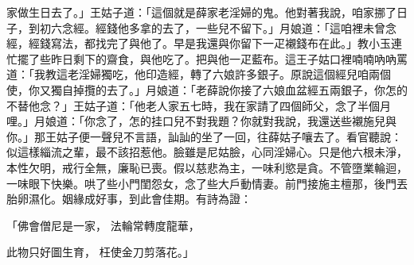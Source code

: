 家做生日去了。」王姑子道：「這個就是薛家老淫婦的鬼。他對著我說，咱家挪了日子，到初六念經。經錢他多拿的去了，一些兒不留下。」月娘道：「這咱裡未曾念經，經錢寫法，都找完了與他了。早是我還與你留下一疋襯錢布在此。」教小玉連忙擺了些昨日剩下的齋食，與他吃了。把與他一疋藍布。這王子姑口裡喃喃吶吶罵道：「我教這老淫婦獨吃，他印造經，轉了六娘許多銀子。原說這個經兒咱兩個使，你又獨自掉攬的去了。」月娘道：「老薛說你接了六娘血盆經五兩銀子，你怎的不替他念？」王姑子道：「他老人家五七時，我在家請了四個師父，念了半個月哩。」月娘道：「你念了，怎的挂口兒不對我題？你就對我說，我還送些襯施兒與你。」那王姑子便一聲兒不言語，訕訕的坐了一回，往薛姑子嚷去了。看官聽說：似這樣緇流之輩，最不該招惹他。臉雖是尼姑臉，心同淫婦心。只是他六根未淨，本性欠明，戒行全無，廉恥已喪。假以慈悲為主，一味利慾是貪。不管墮業輪迴，一味眼下快樂。哄了些小門閨怨女，念了些大戶動情妻。前門接施主檀那，後門丟胎卵濕化。姻緣成好事，到此會佳期。有詩為證：

「佛會僧尼是一家，  法輪常轉度龍華，

此物只好圖生育，  枉使金刀剪落花。」

